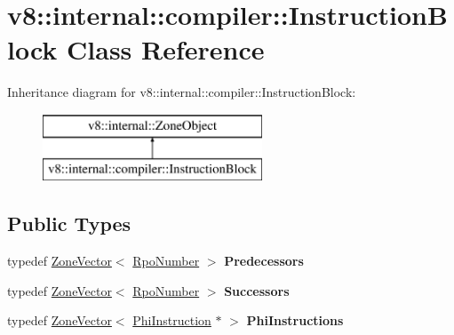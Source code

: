 \hypertarget{classv8_1_1internal_1_1compiler_1_1_instruction_block}{}\section{v8\+:\+:internal\+:\+:compiler\+:\+:Instruction\+Block Class Reference}
\label{classv8_1_1internal_1_1compiler_1_1_instruction_block}
Inheritance diagram for v8\+:\+:internal\+:\+:compiler\+:\+:Instruction\+Block\+:\begin{figure}[H]
\begin{center}
\leavevmode
\includegraphics[height=2.000000cm]{classv8_1_1internal_1_1compiler_1_1_instruction_block}
\end{center}
\end{figure}
\subsection*{Public Types}
\begin{DoxyCompactItemize}
\item 
typedef \hyperlink{classv8_1_1internal_1_1_zone_vector}{Zone\+Vector}$<$ \hyperlink{classv8_1_1internal_1_1compiler_1_1_rpo_number}{Rpo\+Number} $>$ {\bfseries Predecessors}\hypertarget{classv8_1_1internal_1_1compiler_1_1_instruction_block_a9ab6b06c717664f7a8feb17e0bf4137d}{}\label{classv8_1_1internal_1_1compiler_1_1_instruction_block_a9ab6b06c717664f7a8feb17e0bf4137d}

\item 
typedef \hyperlink{classv8_1_1internal_1_1_zone_vector}{Zone\+Vector}$<$ \hyperlink{classv8_1_1internal_1_1compiler_1_1_rpo_number}{Rpo\+Number} $>$ {\bfseries Successors}\hypertarget{classv8_1_1internal_1_1compiler_1_1_instruction_block_a82c6037f394924f2ffd5e2eb9363c154}{}\label{classv8_1_1internal_1_1compiler_1_1_instruction_block_a82c6037f394924f2ffd5e2eb9363c154}

\item 
typedef \hyperlink{classv8_1_1internal_1_1_zone_vector}{Zone\+Vector}$<$ \hyperlink{classv8_1_1internal_1_1compiler_1_1_phi_instruction}{Phi\+Instruction} $\ast$ $>$ {\bfseries Phi\+Instructions}\hypertarget{classv8_1_1internal_1_1compiler_1_1_instruction_block_a7468046d3019f274d7d5f35efdfb9368}{}\label{classv8_1_1internal_1_1compiler_1_1_instruction_block_a7468046d3019f274d7d5f35efdfb9368}

\end{DoxyCompactItemize}
